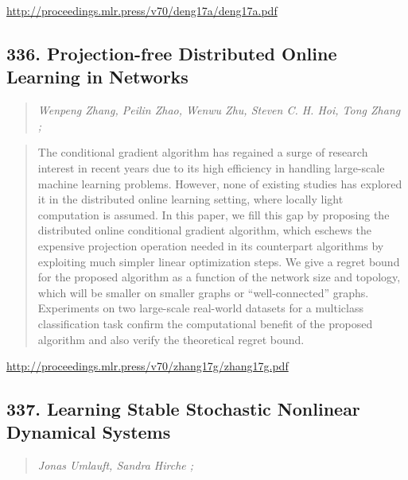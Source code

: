 \documentclass{article}
\begin{document}
\href{http://proceedings.mlr.press/v70/deng17a/deng17a.pdf}{http://proceedings.mlr.press/v70/deng17a/deng17a.pdf}

\subsection{336. Projection-free Distributed Online Learning in Networks}

\begin{quote}
\footnotesize{\textit{Wenpeng Zhang, Peilin Zhao, Wenwu Zhu, Steven C. H. Hoi, Tong Zhang ;}}

\end{quote}

\begin{quote}
    The conditional gradient algorithm has regained a surge of research interest in recent years due to its high efficiency in handling large-scale machine learning problems. However, none of existing studies has explored it in the distributed online learning setting, where locally light computation is assumed. In this paper, we fill this gap by proposing the distributed online conditional gradient algorithm, which eschews the expensive projection operation needed in its counterpart algorithms by exploiting much simpler linear optimization steps. We give a regret bound for the proposed algorithm as a function of the network size and topology, which will be smaller on smaller graphs or “well-connected” graphs. Experiments on two large-scale real-world datasets for a multiclass classification task confirm the computational benefit of the proposed algorithm and also verify the theoretical regret bound.  
\end{quote}

\href{http://proceedings.mlr.press/v70/zhang17g/zhang17g.pdf}{http://proceedings.mlr.press/v70/zhang17g/zhang17g.pdf}

\subsection{337. Learning Stable Stochastic Nonlinear Dynamical Systems}

\begin{quote}
\footnotesize{\textit{Jonas Umlauft, Sandra Hirche ;}}

\end{quote}
\end{document}
